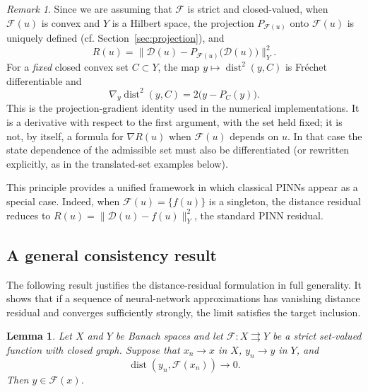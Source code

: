 \documentclass[11pt]{elsarticle}
\newtheorem{lemma}[theorem]{Lemma}
\theoremstyle{definition}
\theoremstyle{remark}
\newtheorem{remark}[theorem]{Remark}
\numberwithin{equation}{section}
\def\dist{\operatorname{dist}}
\begin{document}
	\begin{remark}
		Since we are assuming that $\mathcal{F}$ is strict and closed-valued,
		when $\mathcal{F}(u)$ is convex and $Y$ is a Hilbert space, the
		projection $P_{\mathcal{F}(u)}$ onto $\mathcal{F}(u)$ is uniquely
		defined (cf. Section~\ref{sec:projection}), and
		\[
		R(u)
		=
		\bigl\|\mathcal{D}(u)-P_{\mathcal{F}(u)}\bigl(\mathcal{D}(u)\bigr)\bigr\|_Y^{2}.
		\]
		For a \emph{fixed} closed convex set $C\subset Y$, the map
		$y\mapsto\dist^2(y,C)$ is Fr\'echet differentiable and
		\[
		\nabla_y\dist^2(y,C)=2\bigl(y-P_C(y)\bigr).
		\]
		This is the projection-gradient identity used in the numerical
		implementations. It is a derivative with respect to the first
		argument, with the set held fixed; it is not, by itself, a formula for
		$\nabla R(u)$ when $\mathcal{F}(u)$ depends on $u$. In that case the
		state dependence of the admissible set must also be differentiated (or
		rewritten explicitly, as in the translated-set examples below).
	\end{remark}
	
	This principle provides a unified framework in which classical PINNs
	appear as a special case.  Indeed, when $\mathcal{F}(u)=\{f(u)\}$ is a
	singleton, the distance residual reduces to
	$R(u)=\|\mathcal{D}(u)-f(u)\|_Y^2$, the standard PINN residual.
	
	\subsection{A general consistency result}
	
	The following result justifies the distance-residual formulation in full
	generality.  It shows that if a sequence of neural-network approximations
	has vanishing distance residual and converges sufficiently strongly, the
	limit satisfies the target inclusion.
	
	\begin{lemma}\label{lem:closed-graph}
		Let $X$ and $Y$ be Banach spaces and let $\mathcal{F}: X \rightrightarrows Y$ be a strict set-valued function with closed graph.
		Suppose that $x_n \to x$ in $X$, $y_n \to y$ in $Y$, and 
		\begin{equation} \label{eq:closed-graph-dist}
			\dist(y_n, \mathcal{F}(x_n)) \to 0.
		\end{equation}
		Then $y \in \mathcal{F}(x)$.
	\end{lemma}
	
\end{document}
